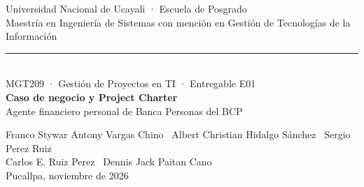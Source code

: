 \documentclass[aspectratio=169,11pt]{beamer}
\begin{document}
{
\begin{frame}[plain]
\vspace{0.1cm}
{\color{crema}\footnotesize Universidad Nacional de Ucayali · Escuela de Posgrado}\\[0.1em]
{\color{crema}\footnotesize Maestría en Ingeniería de Sistemas con mención en Gestión de Tecnologías de la Información}\\[0.5em]
{\color{cobre}\rule{2.1cm}{2.2pt}}\\[0.35em]
{\color{crema}\normalsize MGT209 · Gestión de Proyectos en TI · Entregable E01}\\[0.15em]
{\color{white}\fontsize{24}{28}\selectfont\bfseries Caso de negocio y Project Charter}\\[0.2em]
{\color{crema}\large Agente financiero personal de Banca Personas del BCP}\\[0.5em]
\vspace{0.35cm}

{\color{crema}\footnotesize Franco Stywar Antony Vargas Chino \textperiodcentered\ Albert Christian Hidalgo Sánchez \textperiodcentered\ Sergio Perez Ruiz}\\[0.15em]
{\color{crema}\footnotesize Carlos E. Ruiz Perez \textperiodcentered\ Dennis Jack Paitan Cano}\\[0.3em]
{\color{crema}\scriptsize Pucallpa, noviembre de 2026}
\end{frame}
}
\end{document}

